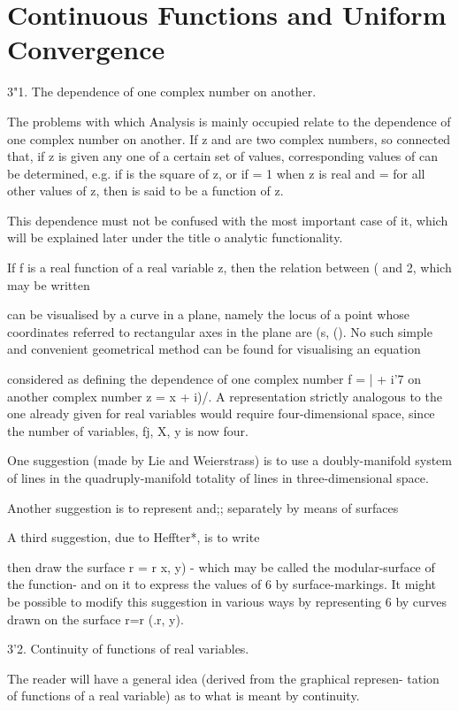 \chapter{Continuous Functions and Uniform Convergence} 

3"1. The dependence of one complex number on another.

The problems with which Analysis is mainly occupied relate to the
dependence of one complex number on another. If z and are two complex
numbers, so connected that, if z is given any one of a certain set of
values, corresponding values of can be determined, e.g. if is the
square of z, or if = 1 when z is real and = for all other values of z,
then is said to be a function of z.

This dependence must not be confused with the most important case of
it, which will be explained later under the title o analytic
functionality.

If f is a real function of a real variable z, then the relation
between ( and 2, which may be written

can be visualised by a curve in a plane, namely the locus of a point
whose coordinates referred to rectangular axes in the plane are (s,
(). No such simple and convenient geometrical method can be found for
visualising an equation

considered as defining the dependence of one complex number f = | +
i'7 on another complex number z = x + i)/. A representation strictly
analogous to the one already given for real variables would require
four-dimensional space, since the number of variables, fj, X, y is
now four.

One suggestion (made by Lie and Weierstrass) is to use a
doubly-manifold system of lines in the quadruply-manifold totality of
lines in three-dimensional space.

Another suggestion is to represent and;; separately by means of
surfaces

A third suggestion, due to Heffter*, is to write

then draw the surface r = r x, y) - which may be called the
modular-surface of the function- and on it to express the values of 6
by surface-markings. It might be possible to modify this suggestion in
various ways by representing 6 by curves drawn on the surface r=r (.r,
y).

3'2. Continuity of functions of real variables.

The reader will have a general idea (derived from the graphical
represen- tation of functions of a real variable) as to what is meant
by continuity.

